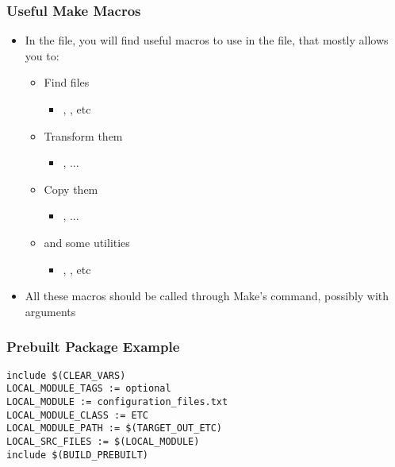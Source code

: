 \begin{frame}
  \frametitle{Useful Make Macros}
  \begin{itemize}
  \item In the  file, you will find
    useful macros to use in the  file, that mostly
    allows you to:
    \begin{itemize}
    \item Find files
      \begin{itemize}
      \item {}, , etc
      \end{itemize}
    \item Transform them
      \begin{itemize}
      \item {}, ...
      \end{itemize}
    \item Copy them
      \begin{itemize}
      \item {}, ...
      \end{itemize}
    \item and some utilities
      \begin{itemize}
      \item {}, , etc
      \end{itemize}
    \end{itemize}
  \item All these macros should be called through Make's  command,
    possibly with arguments
  \end{itemize}
\end{frame}

\begin{frame}[fragile]
  \frametitle{Prebuilt Package Example}
\begin{verbatim}
include $(CLEAR_VARS)
LOCAL_MODULE_TAGS := optional
LOCAL_MODULE := configuration_files.txt
LOCAL_MODULE_CLASS := ETC
LOCAL_MODULE_PATH := $(TARGET_OUT_ETC)
LOCAL_SRC_FILES := $(LOCAL_MODULE)
include $(BUILD_PREBUILT)
\end{verbatim}
\end{frame}


